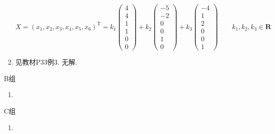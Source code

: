 \begin{enumerate}
          \[ X = (x_1, x_2, x_3, x_4, x_5, x_6)^\mathrm{T} = k_1 \begin{pmatrix} 4 \\ 4 \\ 1 \\ 1 \\ 0 \\ 0 \end{pmatrix} + k_2 \begin{pmatrix} -5 \\ -2 \\ 0 \\ 0 \\ 1 \\ 0 \end{pmatrix} + k_3 \begin{pmatrix} -4 \\ 1 \\ 2 \\ 0 \\ 0 \\ 1 \end{pmatrix} \qquad k_1, k_2, k_3 \in \mathbf{R} \]

    \item 见教材P33例3. 无解.
\end{enumerate}

\centerline{\heiti B组}
\begin{enumerate}
    \item
\end{enumerate}

\centerline{\heiti C组}
\begin{enumerate}
    \item
\end{enumerate}

\clearpage
